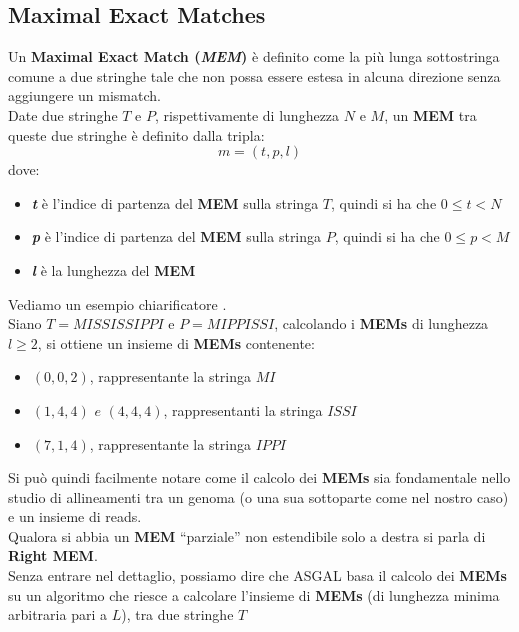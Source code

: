 \documentclass[a4paper,12pt, oneside]{book}
\begin{document}
\subsection{Maximal Exact Matches}
\begin{definizione}
  Un \textbf{Maximal Exact Match (\textit{MEM})} \cite{mem} è definito come la
  più lunga sottostringa comune a due stringhe tale che non possa essere estesa
  in alcuna direzione senza aggiungere un mismatch. \\
  Date due stringhe $T$ e $P$, rispettivamente di lunghezza $N$ e $M$, un
  \textbf{MEM} tra queste due stringhe è definito dalla tripla:
  \[m=(t,p,l)\]
  dove:
  \begin{itemize}
    \item \textit{\textbf{t}} è l'indice di partenza del \textbf{MEM} sulla
    stringa $T$, quindi si ha che $0\leq t< N$
    \item \textit{\textbf{p}} è l'indice di partenza del \textbf{MEM} sulla
    stringa $P$, quindi si ha che $0\leq p< M$ 
    \item \textit{\textbf{l}} è la lunghezza del \textbf{MEM}
  \end{itemize}
\end{definizione}
\begin{esempio}
  Vediamo un esempio chiarificatore \cite{denti}.\\
  Siano $T=MISSISSIPPI$ e $P=MIPPISSI$, calcolando i \textbf{MEMs} di lunghezza
  $l\geq 2$, si ottiene un insieme di \textbf{MEMs} contenente:
  \begin{itemize}
    \item $(0,0,2)$, rappresentante la stringa $MI$
    \item $(1,4,4)\,\,e\,\,(4,4,4)$, rappresentanti la stringa $ISSI$
    \item $(7,1,4)$, rappresentante la stringa $IPPI$
  \end{itemize}
\end{esempio}
\noindent
Si può quindi facilmente notare come il calcolo dei \textbf{MEMs} sia 
fondamentale nello studio di allineamenti tra un genoma (o una sua sottoparte
come nel nostro caso) e un insieme di reads.\\
Qualora si abbia un \textbf{MEM} ``parziale'' non estendibile solo a destra si
parla di \textbf{Right MEM}.\\
Senza entrare nel dettaglio, possiamo dire che ASGAL basa il calcolo dei
\textbf{MEMs} su un algoritmo \cite{mem} che riesce a calcolare l'insieme di
\textbf{MEMs} (di lunghezza minima arbitraria pari a $L$), tra due stringhe $T$
\end{document}
